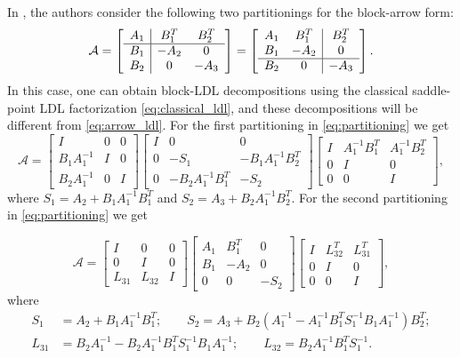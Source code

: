 \documentclass{article}
\newcommand{\sA}{\mathcal{A}}
\begin{document}
In \cite{BeikBenzi2018}, the authors consider the following two partitionings for the block-arrow form:
\begin{equation}
\label{eq:partitioning}
\sA =
\left[ \begin{array}{c | c  c}
    A_1 & B_1^T & B_2^T \\
    \hline
    B_1 & -A_2 & 0 \\
    B_2 & 0 & -A_3
    \end{array}
\right] =
\left[ \begin{array}{c  c | c}
    A_1 & B_1^T & B_2^T \\
    B_1 & -A_2 & 0 \\
    \hline
    B_2 & 0 & -A_3
    \end{array}
\right].
\end{equation}
In this case, one can obtain  block-LDL decompositions using the classical saddle-point LDL factorization \eqref{eq:classical_ldl}, and these decompositions will be different from \eqref{eq:arrow_ldl}. For the first partitioning in \eqref{eq:partitioning} we get
\[
\sA = \begin{bmatrix}
    I & 0 & 0 \\
    B_1 A_1^{-1} & I & 0 \\
    B_2 A_1^{-1} & 0 & I
\end{bmatrix} \begin{bmatrix}
    I & 0 & 0 \\
    0 & -S_1 & -B_1A_1^{-1}B_2^T \\
    0 & -B_2 A_1^{-1}B_1^T & -S_2
\end{bmatrix}\begin{bmatrix}
    I & A_1^{-1}B_1^T & A_1^{-1}B_2^T \\
    0 & I & 0 \\
    0 & 0 & I
\end{bmatrix},
\]
where $S_1 = A_2 + B_1A_1^{-1}B_1^T$ and $S_2= A_3 + B_2A_1^{-1}B_2^T.$ For the second partitioning in \eqref{eq:partitioning} we get

\[
\sA = \begin{bmatrix}
    I & 0 & 0 \\
    0 & I & 0 \\
    L_{31} & L_{32} & I
\end{bmatrix} \begin{bmatrix}
    A_1 & B_1^T & 0 \\
    B_1 & -A_2 & 0 \\
    0 & 0 & -S_2
\end{bmatrix} \begin{bmatrix}
    I & L_{32}^T & L_{31}^T \\
    0 & I & 0 \\
    0 & 0 & I
\end{bmatrix},
\]
where
\begin{align*}
    S_1 &= A_2 + B_1A_1^{-1}B_1^T; \qquad
    S_2 = A_3+B_2 (A_1^{-1} -A_1^{-1} B_1^T S_1^{-1} B_1 A_1^{-1})B_2^T; \\
    L_{31} &= B_2 A_1^{-1} - B_2A_1^{-1}B_1^T S_1^{-1}B_1A_1^{-1}; \qquad
    L_{32} = B_2 A_1^{-1}B_1^T S_1^{-1}.
\end{align*}
\end{document}

